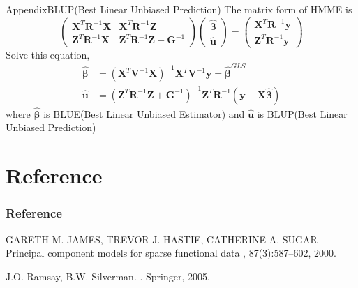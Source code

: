 \documentclass{beamer}
\def \by {\mathbf{y}}
\def \bX {\mathbf{X}}
\def \bbeta {\boldsymbol{\beta}}
\def \bR {\boldsymbol{R}}
\def \bZ {\boldsymbol{Z}}
\def \bG {\boldsymbol{G}}
\def \bu {\boldsymbol{u}}
\def \bV {\boldsymbol{V}}
\begin{document}
\begin{frame}{Appendix}{BLUP(Best Linear Unbiased Prediction)}
	The matrix form of HMME is
	$$ \begin{pmatrix}
		\bX^T\bR^{-1}\bX & \bX^T\bR^{-1}\bZ \\
		\bZ^T\bR^{-1}\bX& \bZ^T\bR^{-1}\bZ+\bG^{-1}
	\end{pmatrix}
	\begin{pmatrix}
	\hat{\bbeta} \\
	\hat{\bu}
	\end{pmatrix} =
	\begin{pmatrix}
	\bX^T\bR^{-1}\by \\
	\bZ^T\bR^{-1}\by
	\end{pmatrix} $$
	Solve this equation,
	$$
	\begin{aligned}
	\hat{\bbeta} &= (\bX^T\bV^{-1}\bX)^{-1}\bX^T\bV^{-1}\by = \hat{\bbeta}^{GLS}\\
	\hat{\bu} &= (\bZ^T\bR^{-1}\bZ+\bG^{-1})^{-1}\bZ^T\bR^{-1}(\by-\bX\hat{\bbeta})
	\end{aligned}$$
	where $\hat{\bbeta}$ is BLUE(Best Linear Unbiased Estimator) and $\hat{\bu}$ is BLUP(Best Linear Unbiased Prediction)
\end{frame}

\appendix
\section{Reference}
\begin{frame}
  \frametitle<presentation>{Reference}
    
  \begin{thebibliography}{10}
  	\beamertemplatearticlebibitems
	 
	GARETH M. JAMES, TREVOR J. HASTIE, CATHERINE A. SUGAR
	\newblock Principal component models for sparse functional data
	, 87(3):587--602,
	2000.
    
  \beamertemplatebookbibitems

		J.O. Ramsay, B.W. Silverman.
		.
		\newblock Springer, 2005.
 
    

  \end{thebibliography}
\end{frame}
\end{document}
